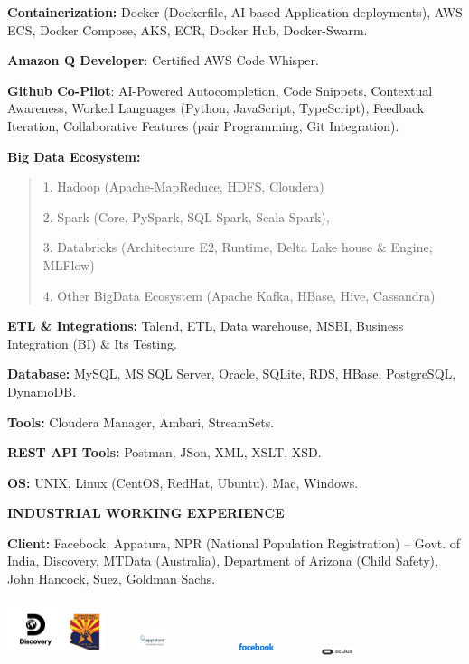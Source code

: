 \documentclass[a4paper]{article}
\begin{document}
\textbf{Containerization:} Docker (Dockerfile, AI based Application
deployments), AWS ECS, Docker Compose, AKS, ECR, Docker Hub,
Docker-Swarm.

\textbf{Amazon Q Developer}: Certified AWS Code Whisper.

\textbf{Github Co-Pilot}: AI-Powered Autocompletion, Code Snippets,
Contextual Awareness, Worked Languages (Python, JavaScript, TypeScript),
Feedback Iteration, Collaborative Features (pair Programming, Git
Integration).

\textbf{Big Data Ecosystem:}

\begin{quote}
1. Hadoop (Apache-MapReduce, HDFS, Cloudera)

2. Spark (Core, PySpark, SQL Spark, Scala Spark),

3. Databricks (Architecture E2, Runtime, Delta Lake house \& Engine,
MLFlow)

4. Other BigData Ecosystem (Apache Kafka, HBase, Hive, Cassandra)
\end{quote}

\textbf{ETL \& Integrations:} Talend, ETL, Data warehouse, MSBI,
Business Integration (BI) \& Its Testing.

\textbf{Database:} MySQL, MS SQL Server, Oracle, SQLite, RDS, HBase,
PostgreSQL, DynamoDB.

\textbf{Tools:} Cloudera Manager, Ambari, StreamSets.

\textbf{REST API Tools:} Postman, JSon, XML, XSLT, XSD.

\textbf{OS:} UNIX, Linux (CentOS, RedHat, Ubuntu), Mac, Windows.

\textbf{INDUSTRIAL WORKING EXPERIENCE}

\textbf{Client:} Facebook, Appatura, NPR (National Population
Registration) -- Govt. of India, Discovery, MTData (Australia),
Department of Arizona (Child Safety), John Hancock, Suez, Goldman Sachs.

\includegraphics[width=0.65486in,height=0.65139in]{media/image9.png}\includegraphics[width=0.47222in,height=0.57639in]{media/image10.jpeg}\includegraphics[width=1.14815in,height=0.39931in]{media/image11.jpg}\includegraphics[width=1.18611in,height=0.22917in]{media/image12.png}\includegraphics[width=0.67361in,height=0.12153in]{media/image13.png}
\end{document}
